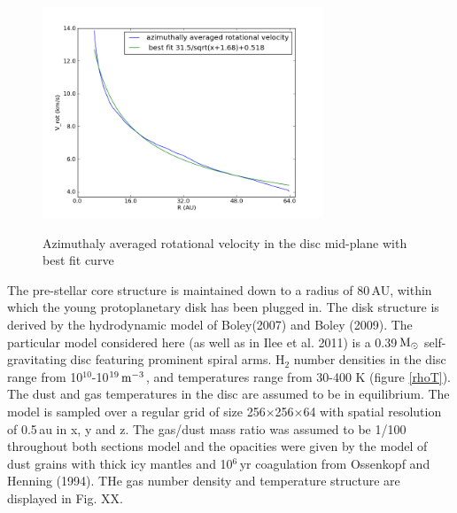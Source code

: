 \documentclass[useAMS,usenatbib]{mn2e}
\begin{document}
\begin{figure}
 \includegraphics[width=84mm]{Figures/model/rotational_velocities.png}
 \label{velocity}
 \caption{Azimuthaly averaged rotational velocity in the disc mid-plane with best fit curve}
\end{figure}


The pre-stellar core structure is maintained down to a radius of 80\,AU, within which the young protoplanetary disk has been plugged in. The disk structure is derived by the hydrodynamic model of Boley(2007) and Boley (2009). The particular model considered here (as well as in Ilee et al. 2011) is a 0.39$\,\rm{M}_\odot$ self-gravitating disc featuring prominent spiral arms. H$_2$ number densities in the disc range from 10$^{10}$-10$^{19}\,\rm{m}^{-3}$, and temperatures range from 30-400 K (figure \ref{rhoT}). The dust and gas temperatures in the disc are assumed to be in equilibrium. The model is sampled over a regular grid of size 256$\times$256$\times$64 with spatial resolution of 0.5$\,$au in x, y and z. The gas/dust mass ratio was assumed to be 1/100 throughout both sections model and the opacities were given by the model of dust grains with thick icy mantles and 10$^6\,$yr coagulation from Ossenkopf and Henning (1994). THe gas number density and temperature structure are displayed in Fig. XX. \newline

\end{document}
